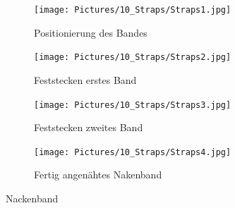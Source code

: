 \documentclass[12pt,parskip=full]{scrartcl}
\begin{document}
\begin{figure}[ht]
    \vspace{0.5cm}
    \centering
    \begin{subfigure}{0.48\textwidth}
        \centering
        \texttt{[image: Pictures/10\_Straps/Straps1.jpg]}
        \caption{Positionierung des Bandes}
        \label{Strap1}
    \end{subfigure}
    \begin{subfigure}{0.48\textwidth}
        \centering
        \texttt{[image: Pictures/10\_Straps/Straps2.jpg]}
        \caption{Feststecken erstes Band}
        \label{Strap2}
    \end{subfigure}
    \begin{subfigure}{0.48\textwidth}
        \centering
        \texttt{[image: Pictures/10\_Straps/Straps3.jpg]}
        \caption{Feststecken zweites Band}
        \label{Strap3}
    \end{subfigure}
    \begin{subfigure}{0.48\textwidth}
        \centering
        \texttt{[image: Pictures/10\_Straps/Straps4.jpg]}
        \caption{Fertig angenähtes Nakenband}
        \label{Strap4}
    \end{subfigure}
    \caption{Nackenband}
    \label{Strap}
\end{figure}
\end{document}
